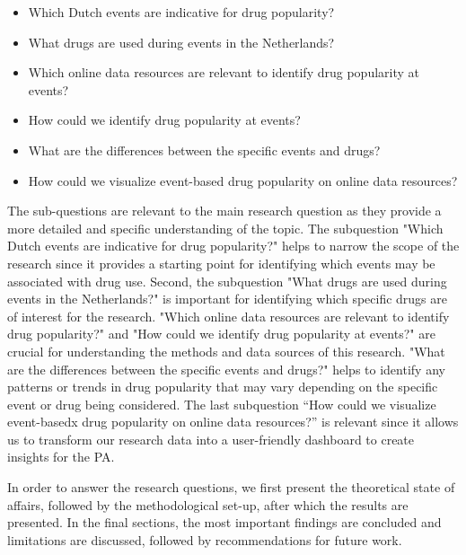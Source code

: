\begin{itemize}
  \item Which Dutch events are indicative for drug popularity?
  \item What drugs are used during events in the Netherlands?
  \item Which online data resources are relevant to identify drug popularity at events?
  \item How could we identify drug popularity at events?
  \item What are the differences between the specific events and drugs?
  \item How could we visualize event-based drug popularity on online data resources?
\end{itemize}

The sub-questions are relevant to the main research question as they provide a more detailed and specific understanding of the topic. The subquestion "Which Dutch events are indicative for drug popularity?" helps to narrow the scope of the research since it provides a starting point for identifying which events may be associated with drug use. Second, the subquestion "What drugs are used during events in the Netherlands?" is important for identifying which specific drugs are of interest for the research. "Which online data resources are relevant to identify drug popularity?" and "How could we identify drug popularity at events?" are crucial for understanding the methods and data sources of this research. "What are the differences between the specific events and drugs?" helps to identify any patterns or trends in drug popularity that may vary depending on the specific event or drug being considered. The last subquestion “How could we visualize event-basedx drug popularity on online data resources?” is relevant since it allows us to transform our research data into a user-friendly dashboard to create insights for the PA.

In order to answer the research questions, we first present the theoretical state of affairs, followed by the methodological set-up, after which the results are presented. In the final sections, the most important findings are concluded and limitations are discussed, followed by recommendations for future work.
